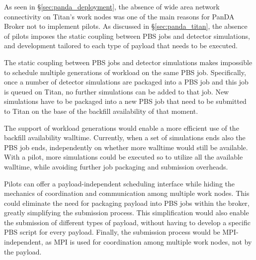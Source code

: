 As seen in \S\ref{sec:panda_deployment}, the absence of wide area network
connectivity on Titan's work nodes was one of the main reasons for PanDA Broker
not to implement pilots. As discussed in \S\ref{sec:panda_titan}, the absence of
pilots imposes the static coupling between PBS jobs and detector simulations,
and development tailored to each type of payload that needs to be executed.

The static coupling between PBS jobs and detector simulations makes impossible
to schedule multiple generations of workload on the same PBS job. Specifically,
once a number of detector simulations are packaged into a PBS job and this job
is queued on Titan, no further simulations can be added to that job. New
simulations have to be packaged into a new PBS job that need to be submitted to
Titan on the base of the backfill availability of that moment.

The support of workload generations would enable a more efficient use of the
backfill availability walltime. Currently, when a set of simulations ends also
the PBS job ends, independently on whether more walltime would still be
available. With a pilot, more simulations could be executed so to utilize all
the available walltime, while avoiding further job packaging and submission
overheads.

Pilots can offer a payload-independent scheduling interface while hiding the
mechanics of coordination and communication among multiple work nodes. This
could eliminate the need for packaging payload into PBS jobs within the broker,
greatly simplifying the submission process. This simplification would also
enable the submission of different types of payload, without having to develop a
specific PBS script for every payload. Finally, the submission process would be
MPI-independent, as MPI is used for coordination among multiple work nodes, not
by the payload.



